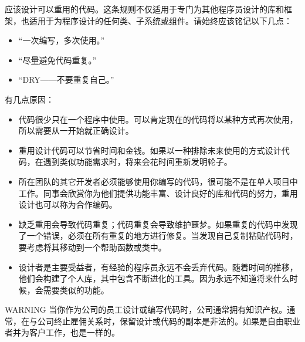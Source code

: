 应该设计可以重用的代码。这条规则不仅适用于专门为其他程序员设计的库和框架，也适用于为程序设计的任何类、子系统或组件。请始终应该铭记以下几点：

\begin{itemize}
\item
“一次编写，多次使用。”

\item
“尽量避免代码重复。”

\item
“DRY——不要重复自己。”
\end{itemize}

有几点原因：

\begin{itemize}
\item
代码很少只在一个程序中使用。可以肯定现在的代码将以某种方式再次使用，所以需要从一开始就正确设计。

\item
重用设计代码可以节省时间和金钱。如果以一种排除未来使用的方式设计代码，在遇到类似功能需求时，将来会花时间重新发明轮子。

\item
所在团队的其它开发者必须能够使用你编写的代码，很可能不是在单人项目中工作。同事会欣赏你为他们提供功能丰富、设计良好的库和代码的努力，重用设计也可以称为合作编码。

\item
缺乏重用会导致代码重复；代码重复会导致维护噩梦。如果重复的代码中发现了一个错误，必须在所有重复的地方进行修复。当发现自己复制粘贴代码时，要考虑将其移动到一个帮助函数或类中。

\item
设计者是主要受益者，有经验的程序员永远不会丢弃代码。随着时间的推移，他们会构建了个人库，其中包含不断进化的工具。因为永远不知道将来什么时候，会需要类似的功能。
\end{itemize}

\begin{myWarning}{WARNING}
当你作为公司的员工设计或编写代码时，公司通常拥有知识产权。通常，在与公司终止雇佣关系时，保留设计或代码的副本是非法的。如果是自由职业者并为客户工作，也是一样的。
\end{myWarning}







